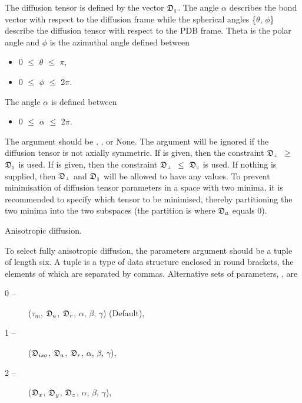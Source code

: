 The diffusion tensor is defined by the vector $\mathfrak{D}_{\scriptscriptstyle \parallel}$.  The angle $\alpha$ describes the bond
vector with respect to the diffusion frame while the spherical angles \{$\theta$, $\phi$\} describe
the diffusion tensor with respect to the PDB frame.  Theta is the polar angle and $\phi$ is the
azimuthal angle defined between

\begin{itemize}
\item[]     0 $\le$ $\theta$ $\le$ $\pi$,
\item[]     0 $\le$ $\phi$ $\le$ 2$\pi$.
\end{itemize}

The angle $\alpha$ is defined between

\begin{itemize}
\item[]     0 $\le$ $\alpha$ $\le$ 2$\pi$.
\end{itemize}

The 
 argument should be 
, 
, or None.  The argument will be
ignored if the diffusion tensor is not axially symmetric.  If 
 is given, then the
constraint $\mathfrak{D}_{\scriptscriptstyle \perp}$ $\ge$ $\mathfrak{D}_{\scriptscriptstyle \parallel}$ is used.  If 
 is given, then the constraint $\mathfrak{D}_{\scriptscriptstyle \perp}$ $\le$ $\mathfrak{D}_{\scriptscriptstyle \parallel}$ is
used.  If nothing is supplied, then $\mathfrak{D}_{\scriptscriptstyle \perp}$ and $\mathfrak{D}_{\scriptscriptstyle \parallel}$ will be allowed to have any values.  To
prevent minimisation of diffusion tensor parameters in a space with two minima, it is
recommended to specify which tensor to be minimised, thereby partitioning the two minima
into the two subspaces (the partition is where $\mathfrak{D}_a$ equals 0).


Anisotropic diffusion.

To select fully anisotropic diffusion, the parameters argument should be a tuple of length
six.  A tuple is a type of data structure enclosed in round brackets, the elements of which
are separated by commas.  Alternative sets of parameters, 
, are

\begin{description}
\item[    0 --]   ($\tau_m$, $\mathfrak{D}_a$, $\mathfrak{D}_r$, $\alpha$, $\beta$, $\gamma$)   (Default),
\item[    1 --]   ($\mathfrak{D}_{iso}$, $\mathfrak{D}_a$, $\mathfrak{D}_r$, $\alpha$, $\beta$, $\gamma$),
\item[    2 --]   ($\mathfrak{D}_x$, $\mathfrak{D}_y$, $\mathfrak{D}_z$, $\alpha$, $\beta$, $\gamma$),
\end{description}

